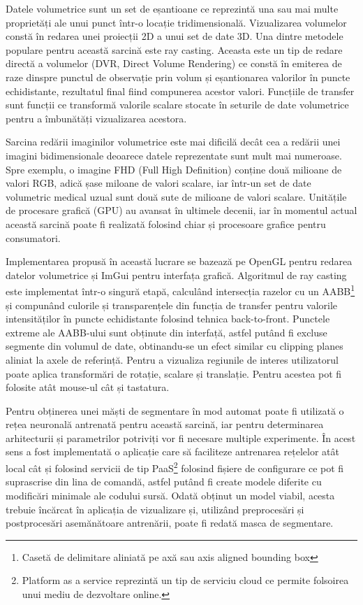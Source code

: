 Datele volumetrice sunt un set de eșantioane ce reprezintă una sau mai multe proprietăți ale unui punct într-o locație tridimensională. Vizualizarea volumelor constă în redarea unei proiecții 2D a unui set de date 3D. Una dintre metodele populare pentru această sarcină este ray casting. Aceasta este un tip de redare directă a volumelor (DVR, Direct Volume Rendering) ce constă în emiterea de raze dinspre punctul de observație prin volum și eșantionarea valorilor în puncte echidistante, rezultatul final fiind compunerea acestor valori. Funcțiile de transfer sunt funcții ce transformă valorile scalare stocate în seturile de date volumetrice pentru a îmbunătăți vizualizarea acestora.

Sarcina redării imaginilor volumetrice este mai dificilă decât cea a redării unei imagini bidimensionale deoarece datele reprezentate sunt mult mai numeroase. Spre exemplu, o imagine FHD (Full High Definition) conține două milioane de valori RGB, adică șase miloane de valori scalare, iar într-un set de date volumetric medical uzual sunt două sute de milioane de valori scalare. Unitățile de procesare grafică (GPU) au avansat în ultimele decenii, iar în momentul actual această sarcină poate fi realizată folosind chiar și procesoare grafice pentru consumatori.

Implementarea propusă în această lucrare se bazează pe OpenGL pentru redarea datelor volumetrice și ImGui pentru interfața grafică. Algoritmul de ray casting este implementat într-o singură etapă, calculând intersecția razelor cu un AABB\footnote{Casetă de delimitare aliniată pe axă sau axis aligned bounding box} și compunând culorile și transparențele din funcția de transfer pentru valorile intensităților în puncte echidistante folosind tehnica back-to-front. Punctele extreme ale AABB-ului sunt obținute din interfață, astfel putând fi excluse segmente din volumul de date, obtinandu-se un efect similar cu clipping planes aliniat la axele de referință. Pentru a vizualiza regiunile de interes utilizatorul poate aplica transformări de rotație, scalare și translație. Pentru acestea pot fi folosite atât mouse-ul cât și tastatura.

Pentru obținerea unei măști de segmentare în mod automat poate fi utilizată o rețea neuronală antrenată pentru această sarcină, iar pentru determinarea arhitecturii și parametrilor potriviți vor fi necesare multiple experimente. În acest sens a fost implementată o aplicație care să faciliteze antrenarea rețelelor atât local cât și folosind servicii de tip PaaS\footnote{Platform as a service reprezintă un tip de serviciu cloud ce permite folsoirea unui mediu de dezvoltare online.} folosind fișiere de configurare ce pot fi suprascrise din lina de comandă, astfel putând fi create modele diferite cu modificări minimale ale codului sursă. Odată obținut un model viabil, acesta trebuie încărcat în aplicația de vizualizare și, utilizând preprocesări și postprocesări asemănătoare antrenării, poate fi redată masca de segmentare.


